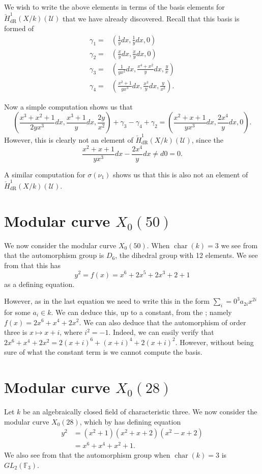 \documentclass[draft, 11pt]{article} %
\theoremstyle{plain}
\theoremstyle{remark}
\newcommand{\cU}{{\mathcal U}}
\newcommand{\cechderhamhone}{\check{H}_{\text {dR}}^1(X/k)}
\DeclareMathOperator{\cha}{char}
\begin{document}
We wish to write the above elements in terms of the basis elements for $\cechderhamhone(\cU)$ that we have already discovered.
Recall that this basis is formed of
\begin{align}
\gamma_1  = & \left( \frac{1}{y}dx, \frac{1}{y}dx, 0\right) \\
\gamma_2 = & \left(\frac{x}{y}dx, \frac{x}{y}dx, 0\right) \\
\gamma_3 = & \left( \frac{1}{yx^2}dx, \frac{x^4 + x^2}{y}dx, \frac{y}{x} \right)\\
\gamma_4 = & \left(\frac{x^2+1}{yx^3}dx, \frac{x^3}{y}dx, \frac{y}{x^2} \right).
\end{align}

Now a simple computation shows us that
\begin{equation}
\left( \frac{x^3 + x^2 + 1}{2yx^3}dx, \frac{x^3 + 1}{y}dx, \frac{2y}{x^2}\right) + \gamma_3 - \gamma_4 + \gamma_2 
= \left( \frac{x^2 + x + 1}{yx^3}dx, \frac{2x^4}{y}dx, 0 \right).
\end{equation}
However, this is clearly not an element of $\cechderhamhone(\cU)$, since the 
\[
\frac{x^2+x+1}{yx^3}dx - \frac{2x^4}{y}dx \neq d0 = 0.
\]

A similar computation for $\sigma(\nu_1)$ shows us that this is also not an element of $\cechderhamhone(\cU)$.

\section{Modular curve $X_0(50)$}
We now consider the modular curve $X_0(50)$.
When $\cha(k) = 3$ we see from \cite[Table 1]{automorphismshyperellipticmodular} that the automorphism group is $D_6$, the dihedral group with 12 elements.
We see from \cite[Table 2]{automorphismshyperellipticmodular} that this has 
\[
y^2 = f(x) = x^6 + 2x^5 + 2x^3 + 2 + 1
\]
as a defining equation.

However, as in the last equation we need to write this in the form $\sum_i=0^3 a_{2i}x^{2i}$ for some $a_i \in k$.
We can deduce this, up to a constant, from the \cite[Table 7]{automorphismshyperellipticmodular}; namely $f(x) = 2x^6 + x^4 +2x^2$.
We can also deduce that the automorphism of order three is $x \mapsto x+i$, where $i^2 = -1$.
Indeed, we can easily verify that $2x^6 + x^4 + 2x^2 = 2(x+i)^6 + (x+i)^4 + 2(x+i)^2$.
However, without being sure of what the constant term is we cannot compute the basis.

\section{Modular curve $X_0(28)$}
Let $k$ be an algebraically closed field of characteristic three.
We now consider the modular curve $X_0(28)$, which by \cite[Table 1]{automorphismshyperellipticmodular} has defining equation 
\begin{align}
y^2 &  = (x^2 + 1)(x^2 + x+2)(x^2-x+2) \\
& = x^6 + x^4 + x^2 + 1.
\end{align}
We also see from \cite[Table 1]{automorphismshyperellipticmodular} that the automorphism group when $\cha(k) = 3$ is $GL_2(\mathbb F_3)$.
\end{document}
